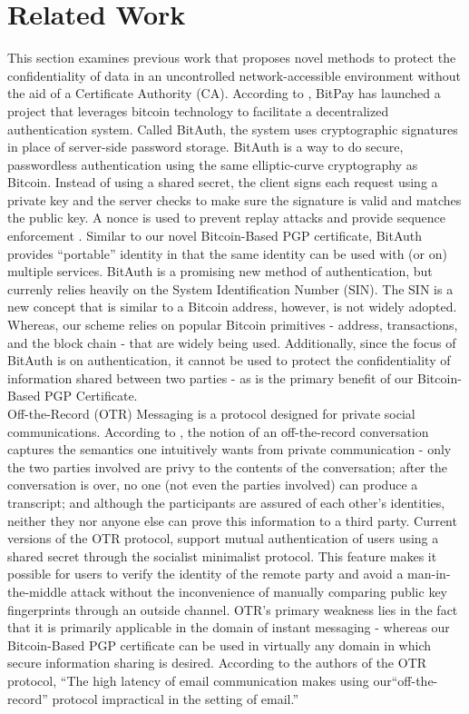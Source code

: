 \documentclass{llncs}
\begin{document}
\section{Related Work}
This section examines previous work that proposes novel methods to protect the confidentiality of data in an uncontrolled network-accessible environment without the aid of a Certificate Authority (CA).  According to \cite{bitpay1}, BitPay has launched a project that leverages bitcoin technology to facilitate a decentralized authentication system.  Called BitAuth, the system uses cryptographic signatures in place of server-side password storage. BitAuth is a way to do secure, passwordless authentication using the same elliptic-curve cryptography as Bitcoin. Instead of using a shared secret, the client signs each request using a private key and the server checks to make sure the signature is valid and matches the public key. A nonce is used to prevent replay attacks and provide sequence enforcement \cite{bitpay2}.  Similar to our novel Bitcoin-Based PGP certificate, BitAuth provides ``portable'' identity in that the same identity can be used with (or on) multiple services. BitAuth is a promising new method of authentication, but currenly relies heavily on the System Identification Number (SIN).  The SIN is a new concept that is similar to a Bitcoin address, however, is not widely adopted.  Whereas, our scheme relies on popular Bitcoin primitives - address, transactions, and the block chain - that are widely being used.  Additionally, since the focus of BitAuth is on authentication, it cannot be used to protect the confidentiality of information shared between two parties - as is the primary benefit of our Bitcoin-Based PGP Certificate.\\  
\indent Off-the-Record (OTR) Messaging is a protocol designed for private social communications. According to \cite{otr1,otr2}, the notion of an off-the-record conversation captures the semantics one intuitively wants from private communication - only the two parties involved are privy to the contents of the conversation; after the conversation is over, no one (not even the parties involved) can produce a transcript; and although the participants are assured of each other's identities, neither they nor anyone else can prove this information to a third party. Current versions of the OTR protocol, support mutual authentication of users using a shared secret through the socialist minimalist protocol.  This feature makes it possible for users to verify the identity of the remote party and avoid a man-in-the-middle attack without the inconvenience of manually comparing public key fingerprints through an outside channel.  OTR's primary weakness lies in the fact that it is primarily applicable in the domain of instant messaging - whereas our Bitcoin-Based PGP certificate can be used in virtually any domain in which secure information sharing is desired.  According to the authors of the OTR protocol, ``The high latency of email communication makes using our``off-the-record'' protocol impractical in the setting of email.'' \\
\end{document}
